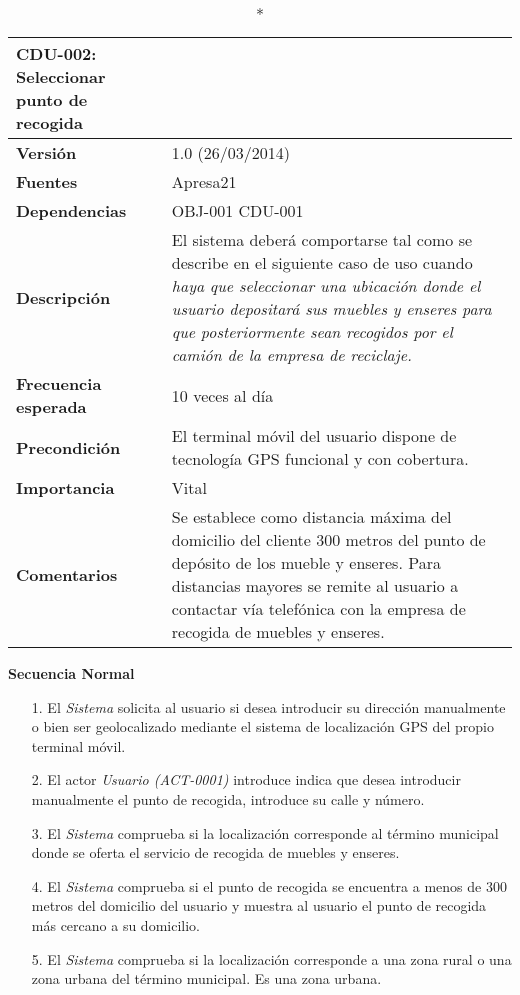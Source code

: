 \begin{longtable}{p{2.5cm}  p{14cm}}
\caption*{\textbf{CDU-002: Seleccionar punto de recogida}} \\
\hline
\textbf{Versión} & 1.0 (26/03/2014) \\
\textbf{Fuentes} & Apresa21 \\
\textbf{Dependencias} & OBJ-001 CDU-001 \\
\textbf{Descripción} & El sistema deberá comportarse tal como se describe en el siguiente caso de uso cuando \textit{haya que seleccionar una ubicación donde el usuario depositará sus muebles y enseres para que posteriormente sean recogidos por el camión de la empresa de reciclaje.} \\
\textbf{Frecuencia esperada} & 10 veces al día \\
\textbf{Precondición} & El terminal móvil del usuario dispone de tecnología GPS funcional y con cobertura. \\
\textbf{Importancia} & Vital  \\
\textbf{Comentarios} & Se establece como distancia máxima del domicilio del cliente 300 metros del punto de depósito de los mueble y enseres. Para distancias mayores se remite al usuario a contactar vía telefónica con la empresa de recogida de muebles y enseres. \\
\end{longtable}

\textbf{Secuencia Normal} 
\begin{enumerate}
	\item[1.] El \textit{Sistema} solicita al usuario si desea introducir su dirección manualmente o bien ser geolocalizado mediante el sistema de localización GPS del propio terminal móvil.
	\item[2.] El actor \textit{Usuario (ACT-0001)} introduce indica que desea introducir manualmente el punto de recogida, introduce su calle y número.
	\item[3.] El \textit{Sistema} comprueba si la localización corresponde al término municipal donde se oferta el servicio de recogida de muebles y enseres.
	\item[4.] El \textit{Sistema} comprueba si el punto de recogida se encuentra a menos de 300 metros del domicilio del usuario y muestra al usuario el punto de recogida más cercano a su domicilio. 
	\item[5.] El \textit{Sistema} comprueba si la localización corresponde a una zona rural o una zona urbana del término municipal. Es una zona urbana. 
\end{enumerate}

